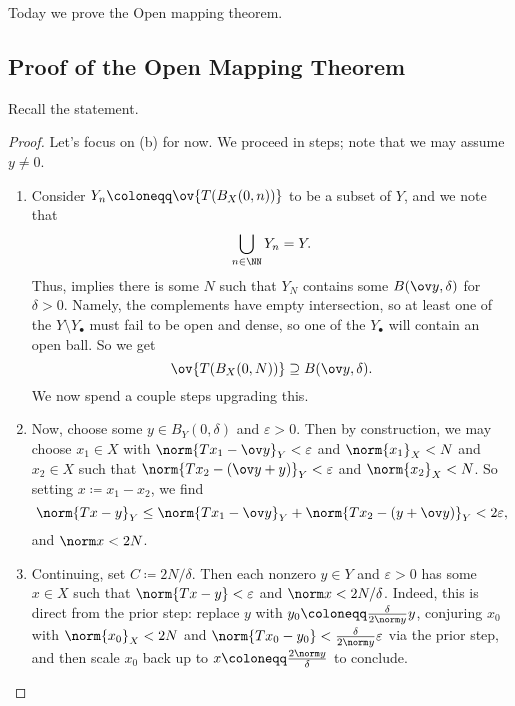 \documentclass[../notes.tex]{subfiles}
\begin{document}
Today we prove the Open mapping theorem.

\subsection{Proof of the Open Mapping Theorem}
Recall the statement.
\omt*
\begin{proof}
	Let's focus on (b) for now. We proceed in steps; note that we may assume $y\ne0$.
	\begin{enumerate}
		\item Consider $Y_n\coloneqq\ov{T(B_X(0,n))}$ to be a subset of $Y$, and we note that
		\[\bigcup_{n\in\NN}Y_n=Y.\]
		Thus,  implies there is some $N$ such that $Y_N$ contains some $B(\ov y,\delta)$ for $\delta>0$. Namely, the complements have empty intersection, so at least one of the $Y\setminus Y_\bullet$ must fail to be open and dense, so one of the $Y_\bullet$ will contain an open ball. So we get
		\[\ov{T(B_X(0,N))}\supseteq B(\ov y,\delta).\]
		We now spend a couple steps upgrading this.
	
		\item Now, choose some $y\in B_Y(0,\delta)$ and $\varepsilon>0$. Then by construction, we may choose $x_1\in X$ with $\norm{Tx_1-\ov y}_Y<\varepsilon$ and $\norm{x_1}_X<N$ and $x_2\in X$ such that $\norm{Tx_2-(\ov y+y)}_Y<\varepsilon$ and $\norm{x_2}_X<N$. So setting $x\coloneqq x_1-x_2$, we find
		\[\norm{Tx-y}_Y\le\norm{Tx_1-\ov y}_Y+\norm{Tx_2-(y+\ov y)}_Y<2\varepsilon,\]
		and $\norm x<2N$.
	
		\item Continuing, set $C\coloneqq2N/\delta$. Then each nonzero $y\in Y$ and $\varepsilon>0$ has some $x\in X$ such that $\norm{Tx-y}<\varepsilon$ and $\norm x<2N/\delta$. Indeed, this is direct from the prior step: replace $y$ with $y_0\coloneqq\frac{\delta}{2\norm y}y$, conjuring $x_0$ with $\norm{x_0}_X<2N$ and $\norm{Tx_0-y_0}<\frac\delta{2\norm y}\varepsilon$ via the prior step, and then scale $x_0$ back up to $x\coloneqq\frac{2\norm y}{\delta}$ to conclude.


\end{enumerate}
\end{proof}
\end{document}

